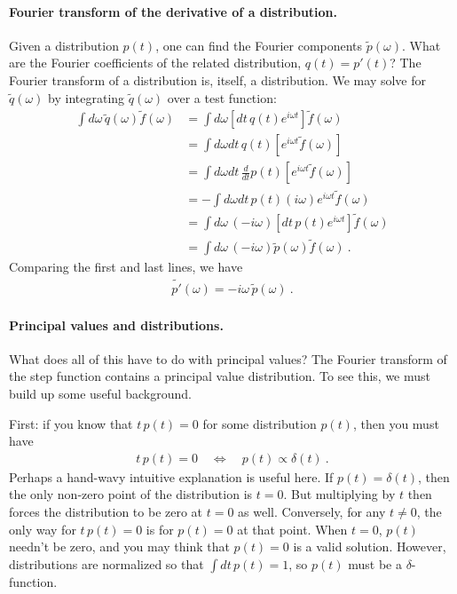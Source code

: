 \paragraph{Fourier transform of the derivative of a distribution.} Given a distribution $p(t)$, one can find the Fourier components $\tilde p(\omega)$. What are the Fourier coefficients of the related distribution, $q(t) = p'(t)$? The Fourier transform of a distribution is, itself, a distribution. We may solve for $\tilde q(\omega)$ by integrating $\tilde q(\omega)$ over a test function:
\begin{align}
	\int d\omega\, \tilde q(\omega) \tilde f(\omega)
	&= 
	\int d\omega \left[dt\, q(t) e^{i\omega t}\right] \tilde f(\omega)
	\\	
	&= 
	\int d\omega dt\, q(t) \left[e^{i\omega t}  \tilde f(\omega)\right]
	\\	
	&= 
	\int d\omega dt\, \frac{d}{dt}p(t) \left[e^{i\omega t}  \tilde f(\omega)\right]
	\\
	&= 
	-\int d\omega dt\, p(t) (i\omega) e^{i\omega t}  \tilde f(\omega)
	\\
	&= 
	\int d\omega\, (-i\omega) \left[dt\,  p(t)  e^{i\omega t}\right]  \tilde f(\omega)
	\\
	&= 
	\int d\omega\, (-i\omega) \tilde p(\omega)  \tilde f(\omega) \ .
\end{align}
Comparing the first and last lines, we have
\begin{align}
	\tilde{p'}(\omega) = -i\omega \, \tilde p(\omega) \ .
	\label{eq:FT:Dist:derivative}
\end{align}




\paragraph{Principal values and distributions.}
What does all of this have to do with principal values? The Fourier transform of the step function contains a principal value distribution. To see this, we must build up some useful background.

First: if you know that $t\, p(t)=0$ for some distribution $p(t)$, then you must have
\begin{align}
	t \, p(t) = 0 \quad\Leftrightarrow \quad
	p(t) \propto \delta(t) \ .
\end{align}
Perhaps a hand-wavy intuitive explanation is useful here. If $p(t)=\delta(t)$, then the only non-zero point of the distribution is $t=0$. But multiplying by $t$ then forces the distribution to be zero at $t=0$ as well. Conversely, for any $t\neq 0$, the only way for $t\,p(t)=0$ is for $p(t)=0$ at that point. When $t=0$, $p(t)$ needn't be zero, and you may think that $p(t)=0$ is a valid solution. However, distributions are normalized so that $\int dt\, p(t) =1$, so $p(t)$ must be a $\delta$-function.

